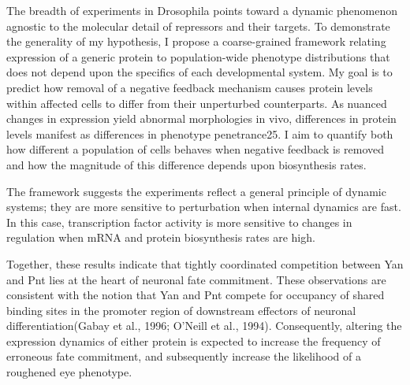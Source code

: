 The breadth of experiments in Drosophila points toward a dynamic phenomenon agnostic to the molecular detail of repressors and their targets. To demonstrate the generality of my hypothesis, I propose a coarse-grained framework relating expression of a generic protein to population-wide phenotype distributions that does not depend upon the specifics of each developmental system. My goal is to predict how removal of a negative feedback mechanism causes protein levels within affected cells to differ from their unperturbed counterparts. As nuanced changes in expression yield abnormal morphologies in vivo, differences in protein levels manifest as differences in phenotype penetrance25. I aim to quantify both how different a population of cells behaves when negative feedback is removed and how the magnitude of this difference depends upon biosynthesis rates.

The framework suggests the experiments reflect a general principle of dynamic systems; they are more sensitive to perturbation when internal dynamics are fast. In this case, transcription factor activity is more sensitive to changes in regulation when mRNA and protein biosynthesis rates are high.






Together, these results indicate that tightly coordinated competition between Yan and Pnt lies at the heart of neuronal fate commitment. These observations are consistent with the notion that Yan and Pnt compete for occupancy of shared binding sites in the promoter region of downstream effectors of neuronal differentiation(Gabay et al., 1996; O’Neill et al., 1994). Consequently, altering the expression dynamics of either protein is expected to increase the frequency of erroneous fate commitment, and subsequently increase the likelihood of a roughened eye phenotype. 
